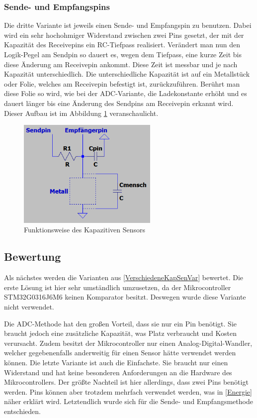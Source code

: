 \documentclass[a4paper,
DIV=13,
12pt,
BCOR=10mm,
department=FakEI,
parskip=half,
automark,
]{article}
\begin{document}
\subsubsection{Sende- und Empfangspins}
Die dritte Variante ist jeweils einen Sende- und Empfangspin zu benutzen. Dabei wird ein sehr hochohmiger Widerstand zwischen zwei Pins gesetzt, der mit der Kapazität des Receivepins ein RC-Tiefpass realisiert. Verändert man nun den Logik-Pegel am Sendpin so dauert es, wegen dem Tiefpass, eine kurze Zeit bis diese Änderung am Receivepin ankommt. Diese Zeit ist messbar und je nach Kapazität unterschiedlich. Die unterschiedliche Kapazität ist auf ein Metallstück oder Folie, welches am Receivepin befestigt ist, zurückzuführen. Berührt man diese Folie so wird, wie bei der ADC-Variante, die Ladekonstante erhöht und es dauert länger bis eine Änderung des Sendpins am Receivepin erkannt wird. Dieser Aufbau ist im Abbildung \ref{fig:KapSensor} veranschaulicht.

\begin{figure}[!hbpt]
 \begin{center} \includegraphics[width=0.6\textwidth]{KapazitiverSensor.png}
 \caption{Funktionsweise des Kapazitiven Sensors}
 \label{fig:KapSensor}
  \end{center}
\end{figure}

\subsection{Bewertung}
\label{Bewertung}
Als nächstes werden die Varianten aus \ref{VerschiedeneKapSenVar} bewertet. Die erste Lösung ist hier sehr umständlich umzusetzen, da der Mikrocontroller STM32G0316J6M6 keinen Komparator besitzt. Deswegen wurde diese Variante nicht verwendet.

Die ADC-Methode hat den großen Vorteil, dass sie nur ein Pin benötigt. Sie braucht jedoch eine zusätzliche Kapazität, was Platz verbraucht und Kosten verursacht. Zudem besitzt der Mikrocontroller nur einen Analog-Digital-Wandler, welcher gegebenenfalls anderweitig für einen Sensor hätte verwendet werden können. 
Die letzte Variante ist auch die Einfachste. Sie braucht nur einen Widerstand und hat keine besonderen Anforderungen an die Hardware des Mikrocontrollers. Der größte Nachteil ist hier allerdings, dass zwei Pins benötigt werden. Pins können aber trotzdem mehrfach verwendet werden, was in \ref{Energie} näher erklärt wird. Letztendlich wurde sich für die Sende- und Empfangsmethode entschieden.
\end{document}
